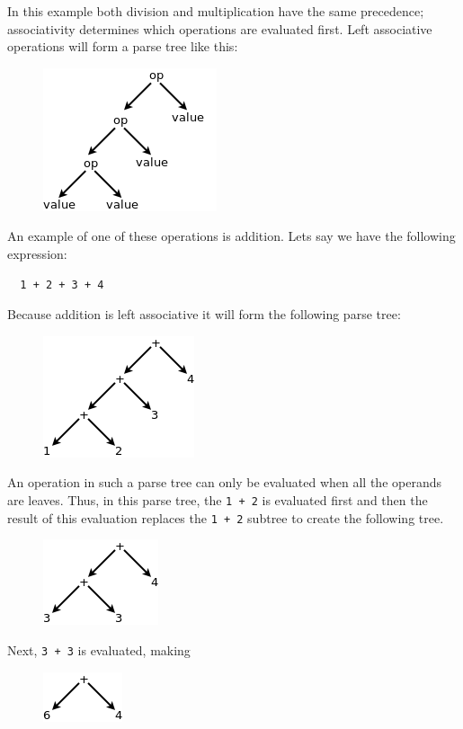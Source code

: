 \documentclass{article}
\newcommand{\code}[1]{\texttt{\textmd{#1}}}
\begin{document}
In this example both division and multiplication have the same precedence; associativity determines
which operations are evaluated first. Left associative operations will form a parse tree like this:
\begin{figure}[H]
  \centering
  \includegraphics{static/left-assoc-gen.png}
\end{figure}

An example of one of these operations is addition. Lets say we have the following expression:
\begin{lstlisting}
  1 + 2 + 3 + 4
\end{lstlisting}

Because addition is left associative it will form the following parse tree:
\begin{figure}[H]
  \centering
  \includegraphics{static/left-assoc-plus.png}
\end{figure}

An operation in such a parse tree can only be evaluated when all the operands are leaves. Thus, in
this parse tree, the \code{1 + 2} is evaluated first and then the result of this evaluation
replaces the \code{1 + 2} subtree to create the following tree.
\begin{figure}[H]
  \centering
  \includegraphics{static/left-assoc-plus-2.png}
\end{figure}

Next, \code{3 + 3} is evaluated, making
\begin{figure}[H]
  \centering
  \includegraphics{static/left-assoc-plus-3.png}
\end{figure}
\end{document}
